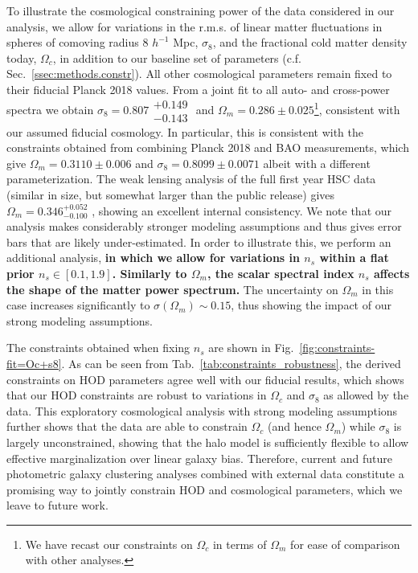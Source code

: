 \documentclass[a4paper,11pt]{article}
\newcommand{\rev}[1]{{\textbf{#1}}}
\begin{document}
    To illustrate the cosmological constraining power of the data considered in our analysis, we allow for variations in the r.m.s. of linear matter fluctuations in spheres of comoving radius 8 $h^{-1}$ Mpc, $\sigma_{8}$, and the fractional cold matter density today, $\Omega_{c}$, in addition to our baseline set of parameters (c.f. Sec.~\ref{ssec:methods.constr}). All other cosmological parameters remain fixed to their fiducial Planck 2018 values. From a joint fit to all auto- and cross-power spectra we obtain $\sigma_{8} = 0.807\substack{+0.149 \\ -0.143}$ and $\Omega_{m} = 0.286 \pm 0.025$\footnote{We have recast our constraints on $\Omega_{c}$ in terms of $\Omega_{m}$ for ease of comparison with other analyses.},
    consistent with our assumed fiducial cosmology.  In particular, this is consistent with the constraints obtained from combining Planck 2018 and BAO measurements, which give $\Omega_m=0.3110\pm 0.006$ and $\sigma_8=0.8099 \pm 0.0071$ \cite{Planck:2018} albeit with a different parameterization. The weak lensing analysis of the full first year HSC data (similar in size, but somewhat larger than the public release) gives $\Omega_m=0.346^{+0.052}_{-0.100}$ \cite{1906.06041}, showing an excellent internal consistency. We note that our analysis makes considerably stronger modeling assumptions and thus gives error bars that are likely under-estimated. In order to illustrate this, we perform an additional analysis, \rev{in which we allow for variations in $n_{s}$ within a flat prior $n_{s} \in [0.1, 1.9]$. Similarly to $\Omega_{m}$, the scalar spectral index $n_{s}$ affects the shape of the matter power spectrum.} The uncertainty on $\Omega_{m}$ in this case increases significantly to $\sigma(\Omega_{m}) \sim 0.15$, thus showing the impact of our strong modeling assumptions.

    The constraints obtained when fixing $n_{s}$ are shown in Fig.~\ref{fig:constraints-fit=Oc+s8}. As can be seen from Tab.~\ref{tab:constraints_robustness}, the derived constraints on HOD parameters agree well with our fiducial results, which shows that our HOD constraints are robust to variations in $\Omega_{c}$ and $\sigma_{8}$ as allowed by the data. This exploratory cosmological analysis with strong modeling assumptions further shows that the data are able to constrain $\Omega_{c}$ (and hence $\Omega_{m}$) while $\sigma_{8}$ is largely unconstrained, showing that the halo model is sufficiently flexible to allow effective marginalization over linear galaxy bias. Therefore, current and future photometric galaxy clustering analyses combined with external data constitute a promising way to jointly constrain HOD and cosmological parameters, which we leave to future work. 
 
\end{document}
